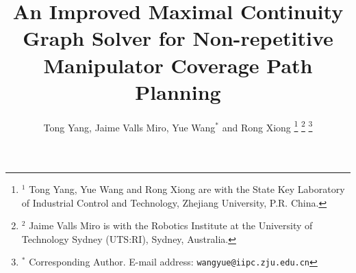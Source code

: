 \documentclass[journal]{IEEEtran}
\begin{document}
\title{An Improved Maximal Continuity Graph Solver for Non-repetitive Manipulator Coverage Path Planning}


\author{Tong Yang, Jaime Valls Miro, Yue Wang$^*$ and Rong Xiong
\thanks{$^1$ Tong Yang, Yue Wang and Rong Xiong are with the State Key 
Laboratory of Industrial Control and Technology, Zhejiang University, P.R. China. 
}
\thanks{$^2$ Jaime Valls Miro is with the Robotics Institute at the University of Technology Sydney (UTS:RI), Sydney, Australia.}
\thanks{$^*$ Corresponding Author. \newline \indent
E-mail address: {\tt\small wangyue@iipc.zju.edu.cn}}
}

\maketitle
\end{document}
